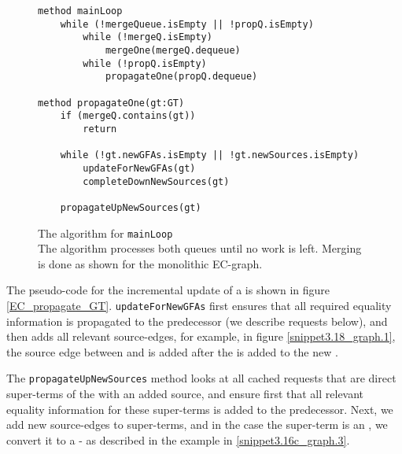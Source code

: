 \begin{figure}
\begin{lstlisting}
method mainLoop
	while (!mergeQueue.isEmpty || !propQ.isEmpty)
		while (!mergeQ.isEmpty)
			mergeOne(mergeQ.dequeue)
		while (!propQ.isEmpty)
			propagateOne(propQ.dequeue)
	
method propagateOne(gt:GT)
	if (mergeQ.contains(gt))
		return
		
	while (!gt.newGFAs.isEmpty || !gt.newSources.isEmpty)
		updateForNewGFAs(gt)
		completeDownNewSources(gt)
	
	propagateUpNewSources(gt)
\end{lstlisting}
\caption{The algorithm for \lstinline|mainLoop|\\
The algorithm processes both queues until no work is left.
Merging is done as shown for the monolithic EC-graph.
}
\label{EC_mainLoop}
\end{figure}

The pseudo-code for the incremental update of a \GT{} is shown in figure \ref{EC_propagate_GT}.
\lstinline|updateForNewGFAs| first ensures that all required equality information is propagated to the predecessor (we describe requests below),
and then adds all relevant source-edges, for example, in figure \ref{snippet3.18_graph.1}, the source edge between  and  is added after the \GFA{}  is added to the new \GT{}.

The \lstinline|propagateUpNewSources| method looks at all cached requests that are direct super-terms of the \GT{} with an added source, 
and ensure first that all relevant equality information for these super-terms is added to the predecessor. 
Next, we add new source-edges to super-terms, and in the case the super-term is an \RGFA{}, we convert it to a \GT{} - as described in the example in \ref{snippet3.16c_graph.3}.

